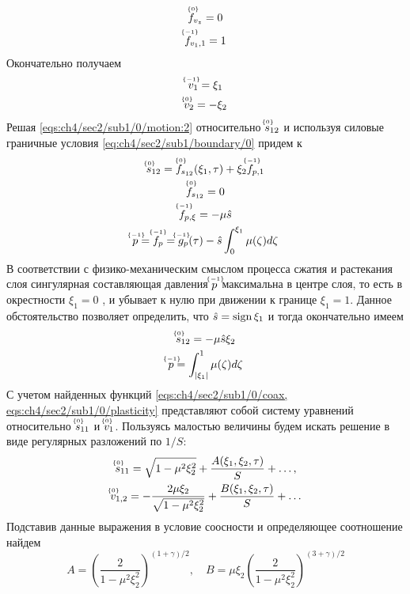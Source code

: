 \begin{gather*}
  \uindex{f}{0}_{v_{z}} = 0
  \\
  \uindex{f}{-1}_{v_{1},1} = 1
\end{gather*}
Окончательно получаем
\begin{gather}
  \label{sol:ch4/sec2/sub1/v1/-1}
  \uindex{v}{-1}_{1} = \xi_1
  \\
  \label{sol:ch4/sec2/sub1/v2/0}
  \uindex{v}{0}_{2} =  -\xi_2
\end{gather}
Решая \cref{eqs:ch4/sec2/sub1/0/motion:2} относительно $\uindex{s}{0}_{12}$ и используя силовые граничные условия \cref{eq:ch4/sec2/sub1/boundary/0} придем к
\begin{gather*}
  \uindex{s}{0}_{12} = \uindex{f}{0}_{s_{12}}(\xi_1, \tau) + \xi_2  \uindex{f}{-1}_{p,1}
  \\
  \uindex{f}{0}_{s_{12}} = 0
  \\
  \uindex{f}{-1}_{p,\xi} = -\mu \hat{s}
  \\
  \uindex{p}{-1}=\uindex{f}{-1}_{p} =\uindex{g}{-1}_{p}(\tau) -\hat{s}\int_0^{\xi_1}{\mu(\zeta)d\zeta}
\end{gather*}
В соответствии с физико-механическим смыслом процесса сжатия и растекания слоя сингулярная составляющая давления $\uindex{p}{-1}$ максимальна в центре слоя, то есть в окрестности $\xi_1 = 0$ , и убывает к нулю при движении к границе $\xi_1=1$. Данное обстоятельство позволяет определить, что $\hat{s} = \sign{\xi_1}$ и тогда окончательно имеем
\begin{gather}
  \label{sol:ch4/sec2/sub1/s12/0}
  \uindex{s}{0}_{12} = -\mu \hat{s} \xi_2
  \\
  \label{sol:ch4/sec2/sub1/p/-1}
  \uindex{p}{-1} = \int_{\vert\xi_1\vert}^1{\mu(\zeta)d\zeta}
\end{gather}
С учетом найденных функций \cref{eqs:ch4/sec2/sub1/0/coax, eqs:ch4/sec2/sub1/0/plasticity} представляют собой систему уравнений относительно $\uindex{s}{0}_{11}$ и $\uindex{v}{0}_{1}$.
Пользуясь малостью величины будем искать решение в виде регулярных разложений по $1/S$:
\begin{gather}
  \uindex{s}{0}_{11} = \sqrt{1-\mu^2\xi_2^2} + \frac{A(\xi_1,\xi_2,\tau)}{S} + \ldots, \\
  \uindex{v}{0}_{1,2} = -\frac{2\mu \xi_2}{\sqrt{1-\mu^2\xi_2^2}} + \frac{B(\xi_1,\xi_2,\tau)}{S} + \ldots
\end{gather}
Подставив данные выражения в условие соосности и определяющее соотношение найдем
\begin{equation}
  A=\left(\frac{2}{1-\mu^2\xi_2^2}\right)^{(1+\gamma)/2}, \quad B = \mu \xi_2 \left(\frac{2}{1-\mu^2\xi_2^2}\right)^{(3+\gamma)/2}
\end{equation}
